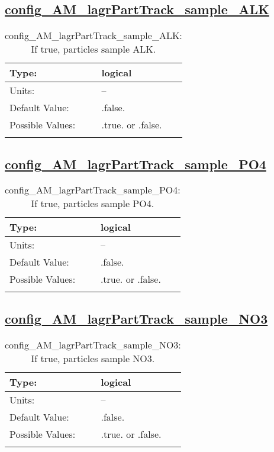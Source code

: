 \subsection[config\_AM\_lagrPartTrack\_sample\_ALK]{\hyperref[sec:nm_tab_AM_lagrPartTrack]{config\_AM\_lagrPartTrack\_sample\_ALK}}
\label{subsec:nm_sec_config_AM_lagrPartTrack_sample_ALK}
\begin{center}
\begin{longtable}{| p{2.0in} || p{4.0in} |}
    \hline
    Type: & logical \\
    \hline
    Units: & -- \\
    \hline
    Default Value: & .false. \\
    \hline
    Possible Values: & .true. or .false. \\
    \hline
    \caption{config\_AM\_lagrPartTrack\_sample\_ALK: If true, particles sample ALK.}
\end{longtable}
\end{center}
\subsection[config\_AM\_lagrPartTrack\_sample\_PO4]{\hyperref[sec:nm_tab_AM_lagrPartTrack]{config\_AM\_lagrPartTrack\_sample\_PO4}}
\label{subsec:nm_sec_config_AM_lagrPartTrack_sample_PO4}
\begin{center}
\begin{longtable}{| p{2.0in} || p{4.0in} |}
    \hline
    Type: & logical \\
    \hline
    Units: & -- \\
    \hline
    Default Value: & .false. \\
    \hline
    Possible Values: & .true. or .false. \\
    \hline
    \caption{config\_AM\_lagrPartTrack\_sample\_PO4: If true, particles sample PO4.}
\end{longtable}
\end{center}
\subsection[config\_AM\_lagrPartTrack\_sample\_NO3]{\hyperref[sec:nm_tab_AM_lagrPartTrack]{config\_AM\_lagrPartTrack\_sample\_NO3}}
\label{subsec:nm_sec_config_AM_lagrPartTrack_sample_NO3}
\begin{center}
\begin{longtable}{| p{2.0in} || p{4.0in} |}
    \hline
    Type: & logical \\
    \hline
    Units: & -- \\
    \hline
    Default Value: & .false. \\
    \hline
    Possible Values: & .true. or .false. \\
    \hline
    \caption{config\_AM\_lagrPartTrack\_sample\_NO3: If true, particles sample NO3.}
\end{longtable}
\end{center}
